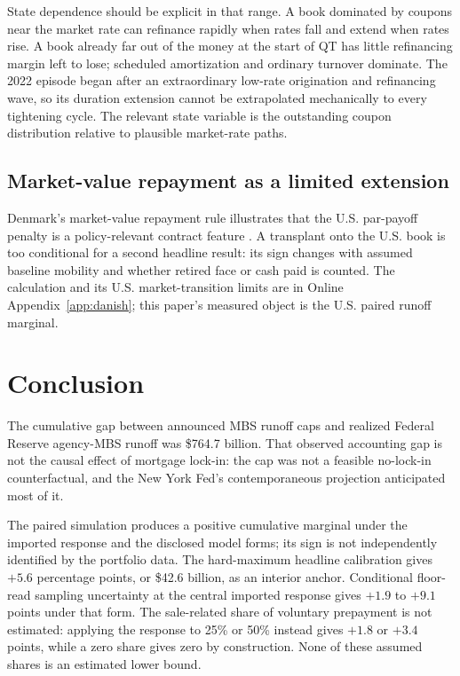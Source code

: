 State dependence should be explicit in that range. A book dominated by coupons near the market rate can refinance rapidly when rates fall and extend when rates rise. A book already far out of the money at the start of QT has little refinancing margin left to lose; scheduled amortization and ordinary turnover dominate. The 2022 episode began after an extraordinary low-rate origination and refinancing wave, so its duration extension cannot be extrapolated mechanically to every tightening cycle. The relevant state variable is the outstanding coupon distribution relative to plausible market-rate paths.

\subsection{Market-value repayment as a limited extension}

Denmark's market-value repayment rule illustrates that the U.S. par-payoff penalty is a policy-relevant contract feature \citep{campbell2013,berg2018,andersen2020}. A transplant onto the U.S. book is too conditional for a second headline result: its sign changes with assumed baseline mobility and whether retired face or cash paid is counted. The calculation and its U.S. market-transition limits are in Online Appendix~\ref{app:danish}; this paper's measured object is the U.S. paired runoff marginal.

\section{Conclusion}\label{sec:conclusion}\label{sec:limitations}

The cumulative gap between announced MBS runoff caps and realized Federal Reserve agency-MBS runoff was \$764.7 billion. That observed accounting gap is not the causal effect of mortgage lock-in: the cap was not a feasible no-lock-in counterfactual, and the New York Fed's contemporaneous projection anticipated most of it.

The paired simulation produces a positive cumulative marginal under the imported response and the disclosed model forms; its sign is not independently identified by the portfolio data. The hard-maximum headline calibration gives $+5.6$ percentage points, or \$42.6 billion, as an interior anchor. Conditional floor-read sampling uncertainty at the central imported response gives $+1.9$ to $+9.1$ points under that form. The sale-related share of voluntary prepayment is not estimated: applying the response to 25\% or 50\% instead gives $+1.8$ or $+3.4$ points, while a zero share gives zero by construction. None of these assumed shares is an estimated lower bound.

